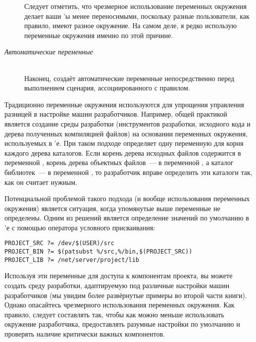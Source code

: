 \begin{description}
Следует отметить, что чрезмерное использование переменных окружения
делает ваши \Makefile{}'ы менее переносимыми, поскольку разные
пользователи, как правило, имеют разное окружение. На самом деле, я
редко использую переменные окружения именно по этой причине.
\item[\emph{Автоматические переменные}] \hfill \\
Наконец, \GNUmake{} создаёт автоматические переменные непосредственно
перед выполнением сценария, ассоциированного с правилом.
\end{description}

Традиционно переменные окружения используются для упрощения управления
разницей в настройке машин разработчиков. Например, общей практикой
является создание среды разработки (инструментов разработки, исходного
кода и дерева полученных компиляцией файлов) на основании переменных
окружения, используемых в \Makefile{}'е. При таком подходе \Makefile{}
определяет одну переменную для корня каждого дерева каталогов. Если
корень дерева исходных файлов содержится в переменной
, корень дерева объектных файлов~--- в
переменной , а каталог библиотек~--- в
переменной , то разработчик вправе определить
эти каталоги так, как он считает нужным.

Потенциальной проблемой такого подхода (и вообще использования
переменных окружения) является ситуация, когда упомянутые выше
переменные не определены. Одним из решений является определение
значений по умолчанию в \Makefile{}'е с помощью оператора условного
присваивания:

{\footnotesize
\begin{verbatim}
PROJECT_SRC ?= /dev/$(USER)/src
PROJECT_BIN ?= $(patsubst %/src,%/bin,$(PROJECT_SRC))
PROJECT_LIB ?= /net/server/project/lib
\end{verbatim}
}

Используя эти переменные для доступа к компонентам проекта, вы можете
создать среду разработки, адаптируемую под различные настройки машин
разработчиков (мы увидим более развёрнутые примеры во второй части
книги). Однако опасайтесь чрезмерного использования переменных
окружения. Как правило, \Makefile{} следует составлять так, чтобы как
можно меньше использовать окружение разработчика, предоставлять
разумные настройки по умолчанию и проверять наличие критически важных
компонентов.

